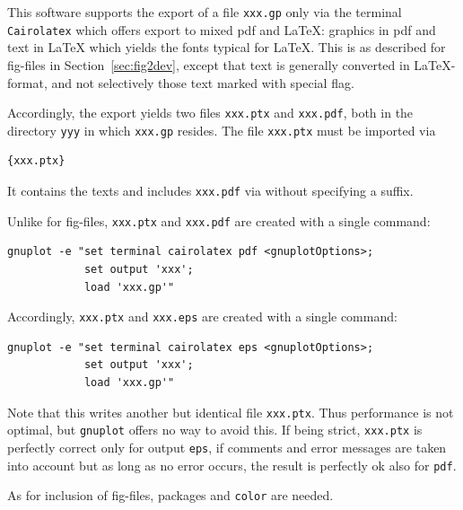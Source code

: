 \documentclass[12pt]{book}
\begin{document}
This software supports the export of a file \texttt{xxx.gp} 
only via the terminal \texttt{Cairolatex} 
which offers export to mixed pdf and \LaTeX\@: 
graphics in pdf and text in \LaTeX{}
which yields the fonts typical for \LaTeX. 
This is as described for fig-files in Section~\ref{sec:fig2dev}, 
except that text is generally converted in \LaTeX{}-format, 
and not selectively those text marked with special flag. 

Accordingly, the export yields two files \texttt{xxx.ptx} and
\texttt{xxx.pdf}, both in the directory \texttt{yyy} 
in which \texttt{xxx.gp} resides. 
The file \texttt{xxx.ptx} must be imported via 
%
\begin{verbatim}
{xxx.ptx}
\end{verbatim}
%
It contains the texts and includes \texttt{xxx.pdf} 
via  without specifying a suffix. 

Unlike for fig-files, 
\texttt{xxx.ptx} and \texttt{xxx.pdf} are created with a single command: 
%
\begin{verbatim}
gnuplot -e "set terminal cairolatex pdf <gnuplotOptions>;
            set output 'xxx';
            load 'xxx.gp'"
\end{verbatim}

Accordingly, 
\texttt{xxx.ptx} and \texttt{xxx.eps} are created with a single command: 
%
\begin{verbatim}
gnuplot -e "set terminal cairolatex eps <gnuplotOptions>;
            set output 'xxx';
            load 'xxx.gp'"
\end{verbatim}
%
Note that this writes another but identical file \texttt{xxx.ptx}. 
Thus performance is not optimal, 
but \texttt{gnuplot} offers no way to avoid this. 
If being strict, 
\texttt{xxx.ptx} is perfectly correct only for output \texttt{eps}, 
if comments and error messages are taken into account 
but as long as no error occurs, 
the result is perfectly ok also for \texttt{pdf}. 

As for inclusion of fig-files, 
packages  and \texttt{color} are needed. 


\end{document}
